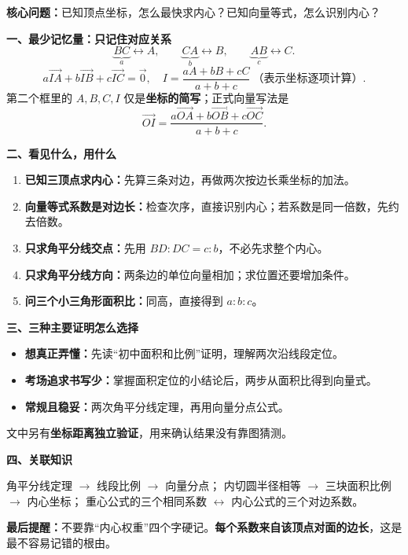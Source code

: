 \par\noindent\begin{minipage}{\linewidth}
\begin{summarybox}
\textbf{核心问题：}已知顶点坐标，怎么最快求内心？已知向量等式，怎么识别内心？

\medskip
\textbf{一、最少记忆量：只记住对应关系}
\[
\underbrace{BC}_{a}\longleftrightarrow A,\qquad
\underbrace{CA}_{b}\longleftrightarrow B,\qquad
\underbrace{AB}_{c}\longleftrightarrow C.
\]
\[
\boxed{a\vec{IA}+b\vec{IB}+c\vec{IC}=\vec0},\quad
\boxed{I=\frac{aA+bB+cC}{a+b+c}\ \text{（表示坐标逐项计算）}}.
\]
第二个框里的 $A,B,C,I$ 仅是\textbf{坐标的简写}；正式向量写法是
\[
\vec{OI}=\frac{a\vec{OA}+b\vec{OB}+c\vec{OC}}{a+b+c}.
\]

\textbf{二、看见什么，用什么}
\begin{enumerate}
\item \textbf{已知三顶点求内心：}先算三条对边，再做两次按边长乘坐标的加法。
\item \textbf{向量等式系数是对边长：}检查次序，直接识别内心；若系数是同一倍数，先约去倍数。
\item \textbf{只求角平分线交点：}先用 $BD:DC=c:b$，不必先求整个内心。
\item \textbf{只求角平分线方向：}两条边的单位向量相加；求位置还要增加条件。
\item \textbf{问三个小三角形面积比：}同高，直接得到 $a:b:c$。
\end{enumerate}

\textbf{三、三种主要证明怎么选择}
\begin{itemize}
\item \textbf{想真正弄懂：}先读“初中面积和比例”证明，理解两次沿线段定位。
\item \textbf{考场追求书写少：}掌握面积定位的小结论后，两步从面积比得到向量式。
\item \textbf{常规且稳妥：}两次角平分线定理，再用向量分点公式。
\end{itemize}
文中另有\textbf{坐标距离独立验证}，用来确认结果没有靠图猜测。

\textbf{四、关联知识}

角平分线定理 $\to$ 线段比例 $\to$ 向量分点；
内切圆半径相等 $\to$ 三块面积比例 $\to$ 内心坐标；
重心公式的三个相同系数 $\leftrightarrow$ 内心公式的三个对边系数。

\medskip
\textbf{最后提醒：}不要靠“内心权重”四个字硬记。\textbf{每个系数来自该顶点对面的边长}，这是最不容易记错的根由。
\end{summarybox}
\end{minipage}\par
